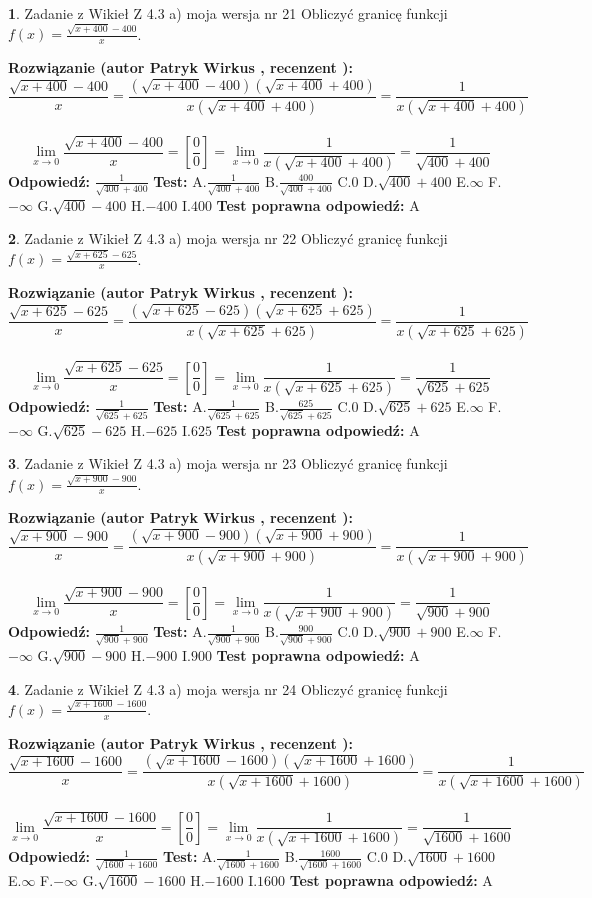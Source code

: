 \documentclass[12pt, a4paper]{article}
\theoremstyle{definition} %
\newtheorem{zad}{}
\newcommand{\zadStart}[1]{\begin{zad}#1\newline}
\newcommand{\zadStop}{\end{zad}}
\newcommand{\rozwStart}[2]{\noindent \textbf{Rozwiązanie (autor #1 , recenzent #2): }\newline}
\newcommand{\rozwStop}{\newline}
\newcommand{\odpStart}{\noindent \textbf{Odpowiedź:}\newline}
\newcommand{\odpStop}{\newline}
\newcommand{\testStart}{\noindent \textbf{Test:}\newline}
\newcommand{\testStop}{\newline}
\newcommand{\kluczStart}{\noindent \textbf{Test poprawna odpowiedź:}\newline}
\newcommand{\kluczStop}{\newline}
\begin{document}
\zadStart{Zadanie z Wikieł Z 4.3 a) moja wersja nr 21}
Obliczyć granicę funkcji $f(x)=\frac{\sqrt{x+400}-400}{x}$.
\zadStop
\rozwStart{Patryk Wirkus}{}
$$\frac{\sqrt{x+400}-400}{x}=\frac{(\sqrt{x+400}-400)(\sqrt{x+400}+400)}{x(\sqrt{x+400}+400)}=\frac{1}{x(\sqrt{x+400}+400)}$$
\\
$$\lim\limits_{x\to0}\frac{\sqrt{x+400}-400}{x}=[\frac{0}{0}]=
\lim\limits_{x\to0}\frac{1}{x(\sqrt{x+400}+400)} = \frac{1}{\sqrt{400}+400}$$
\rozwStop
\odpStart
$\frac{1}{\sqrt{400}+400}$
\odpStop
\testStart
A.$\frac{1}{\sqrt{400}+400}$
B.$\frac{400}{\sqrt{400}+400}$
C.$0$
D.$\sqrt{400}+400$
E.$\infty$
F.$-\infty$
G.$\sqrt{400}-400$
H.$-400$
I.$400$
\testStop
\kluczStart
A
\kluczStop



\zadStart{Zadanie z Wikieł Z 4.3 a) moja wersja nr 22}
Obliczyć granicę funkcji $f(x)=\frac{\sqrt{x+625}-625}{x}$.
\zadStop
\rozwStart{Patryk Wirkus}{}
$$\frac{\sqrt{x+625}-625}{x}=\frac{(\sqrt{x+625}-625)(\sqrt{x+625}+625)}{x(\sqrt{x+625}+625)}=\frac{1}{x(\sqrt{x+625}+625)}$$
\\
$$\lim\limits_{x\to0}\frac{\sqrt{x+625}-625}{x}=[\frac{0}{0}]=
\lim\limits_{x\to0}\frac{1}{x(\sqrt{x+625}+625)} = \frac{1}{\sqrt{625}+625}$$
\rozwStop
\odpStart
$\frac{1}{\sqrt{625}+625}$
\odpStop
\testStart
A.$\frac{1}{\sqrt{625}+625}$
B.$\frac{625}{\sqrt{625}+625}$
C.$0$
D.$\sqrt{625}+625$
E.$\infty$
F.$-\infty$
G.$\sqrt{625}-625$
H.$-625$
I.$625$
\testStop
\kluczStart
A
\kluczStop



\zadStart{Zadanie z Wikieł Z 4.3 a) moja wersja nr 23}
Obliczyć granicę funkcji $f(x)=\frac{\sqrt{x+900}-900}{x}$.
\zadStop
\rozwStart{Patryk Wirkus}{}
$$\frac{\sqrt{x+900}-900}{x}=\frac{(\sqrt{x+900}-900)(\sqrt{x+900}+900)}{x(\sqrt{x+900}+900)}=\frac{1}{x(\sqrt{x+900}+900)}$$
\\
$$\lim\limits_{x\to0}\frac{\sqrt{x+900}-900}{x}=[\frac{0}{0}]=
\lim\limits_{x\to0}\frac{1}{x(\sqrt{x+900}+900)} = \frac{1}{\sqrt{900}+900}$$
\rozwStop
\odpStart
$\frac{1}{\sqrt{900}+900}$
\odpStop
\testStart
A.$\frac{1}{\sqrt{900}+900}$
B.$\frac{900}{\sqrt{900}+900}$
C.$0$
D.$\sqrt{900}+900$
E.$\infty$
F.$-\infty$
G.$\sqrt{900}-900$
H.$-900$
I.$900$
\testStop
\kluczStart
A
\kluczStop



\zadStart{Zadanie z Wikieł Z 4.3 a) moja wersja nr 24}
Obliczyć granicę funkcji $f(x)=\frac{\sqrt{x+1600}-1600}{x}$.
\zadStop
\rozwStart{Patryk Wirkus}{}
$$\frac{\sqrt{x+1600}-1600}{x}=\frac{(\sqrt{x+1600}-1600)(\sqrt{x+1600}+1600)}{x(\sqrt{x+1600}+1600)}=\frac{1}{x(\sqrt{x+1600}+1600)}$$
\\
$$\lim\limits_{x\to0}\frac{\sqrt{x+1600}-1600}{x}=[\frac{0}{0}]=
\lim\limits_{x\to0}\frac{1}{x(\sqrt{x+1600}+1600)} = \frac{1}{\sqrt{1600}+1600}$$
\rozwStop
\odpStart
$\frac{1}{\sqrt{1600}+1600}$
\odpStop
\testStart
A.$\frac{1}{\sqrt{1600}+1600}$
B.$\frac{1600}{\sqrt{1600}+1600}$
C.$0$
D.$\sqrt{1600}+1600$
E.$\infty$
F.$-\infty$
G.$\sqrt{1600}-1600$
H.$-1600$
I.$1600$
\testStop
\kluczStart
A
\kluczStop
\end{document}

